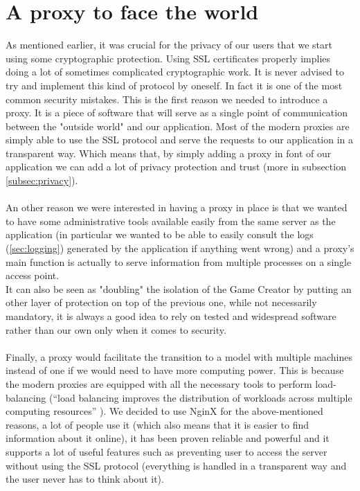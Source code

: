 \section{A proxy to face the world}\label{sec:proxy}
As mentioned earlier, it was crucial for the privacy of our users that we start using some cryptographic protection. Using SSL certificates properly implies doing a lot of sometimes complicated cryptographic work. It is never advised to try and implement this kind of protocol by oneself. In fact it is one of the most common security mistakes\cite{selfcrypto}. This is the first reason we needed to introduce a proxy\cite{reverseproxy}. It is a piece of software that will serve as a single point of communication between the "outside world" and our application. Most of the modern proxies are simply able to use the SSL protocol and serve the requests to our application in a transparent way. Which means that, by simply adding a proxy in font of our application we can add a lot of privacy protection and trust (more in subsection \ref{subsec:privacy}).\\\\
An other reason we were interested in having a proxy in place is that we wanted to have some administrative tools available easily from the same server as the application (in particular we wanted to be able to easily consult the logs (\ref{sec:logging}) generated by the application if anything went wrong) and a proxy's main function is actually to serve information from multiple processes on a single access point.\\
It can also be seen as "doubling" the isolation of the Game Creator by putting an other layer of protection on top of the previous one, while not necessarily mandatory, it is always a good idea to rely on tested and widespread software rather than our own only when it comes to security.\\\\
Finally, a proxy would facilitate the transition to a model with multiple machines instead of one if we would need to have more computing power. This is because the modern proxies are equipped with all the necessary tools to perform load-balancing (``load balancing improves the distribution of workloads across multiple computing resources'' \cite{loadbalancing}).
We decided to use NginX\cite{nginx} for the above-mentioned reasons, a lot of people use it (which also means that it is easier to find information about it online), it has been proven reliable and powerful and it supports a lot of useful features such as preventing user to access the server without using the SSL protocol (everything is handled in a transparent way and the user never has to think about it).
